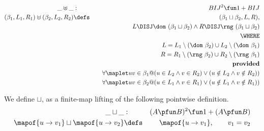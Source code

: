 \begin{eqnarray*}
 \_\uplus\_ &:& BIJ^2 \fun 1 + BIJ
\\ (\beta_1,L_1,R_1) \uplus (\beta_2,L_2,R_2)
   &\defs&
   (\beta_1\sqcup\beta_2,L,R),
\\ &&\qquad
     L \DISJ \dom~(\beta_1\sqcup\beta_2)
     \land
     R \DISJ \rng~(\beta_1\sqcup\beta_2)
\\ && \WHERE
\\ && \quad L = L_1\setminus(\dom~\beta_2)
                \cup
                L_2\setminus(\dom~\beta_1)
\\ && \quad R = R_1\setminus(\rng~\beta_2)
                \cup
                R_2\setminus(\rng~\beta_1)
\\ && \textbf{provided}
\\ && \quad  \forall \maplet u v \in \beta_1
          @ (u \in L_2 \land v \in R_2) \lor (u \notin L_2 \land v \notin R_2))
\\ && \quad \forall \maplet u v \in \beta_2
          @ (u \in L_1 \land v \in R_1) \lor (u \notin L_1 \land v \notin R_1))
\end{eqnarray*}

We define $\sqcup$,
as a finite-map lifting of the following pointwise definition.
\begin{eqnarray*}
   \_\sqcup\_ &:& (A \pfun B)^2 \fun 1 + (A \pfun B)
\\ \mapof{u \to v_1} \sqcup \mapof{u \to v_2}
   &\defs& \mapof{u \to v_1}, \qquad v_1 = v_2
\end{eqnarray*}
